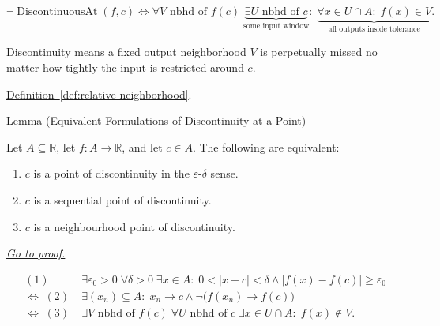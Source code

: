 \begin{remark*}
\[
\neg \operatorname{DiscontinuousAt}(f,c)
\Longleftrightarrow
\forall V \text{ nbhd of } f(c)\;
\underbrace{\exists U \text{ nbhd of } c}_{\text{some input window}}
:\;
\underbrace{\forall x \in U \cap A:\; f(x) \in V}_{\text{all outputs inside tolerance}}.
\]
\end{remark*}

\begin{remark*}[Interpretation]
Discontinuity means a fixed output neighborhood $V$ is perpetually missed no matter how tightly the input is restricted around $c$.
\end{remark*}

\begin{remark*}[Dependencies]
\hyperref[def:relative-neighborhood]{Definition~\ref*{def:relative-neighborhood}}.
\end{remark*}


\begin{lemmabox}{Lemma (Equivalent Formulations of Discontinuity at a Point)}
\begin{lemma}
\label{lem:equivalent-discontinuity-at-a-point}
Let $A\subseteq \mathbb{R}$, let $f:A\to\mathbb{R}$, and let $c\in A$. The following are equivalent:
\begin{enumerate}
\item $c$ is a point of discontinuity in the $\varepsilon$-$\delta$ sense.
\item $c$ is a sequential point of discontinuity.
\item $c$ is a neighbourhood point of discontinuity.
\end{enumerate}

\smallskip\noindent
\hyperref[prf:equivalent-discontinuity-at-a-point]{\textit{Go to proof.}}
\end{lemma}
\end{lemmabox}

\begin{remark*}
\[
\begin{aligned}
(1)\; &\exists \varepsilon_0>0\;\forall \delta>0\;\exists x\in A:\;0<|x-c|<\delta \land |f(x)-f(c)|\ge \varepsilon_0\\
\Longleftrightarrow\;
(2)\; &\exists (x_n)\subseteq A:\; x_n \to c \land \neg\bigl(f(x_n)\to f(c)\bigr)\\
\Longleftrightarrow\;
(3)\; &\exists V \text{ nbhd of } f(c)\;\forall U \text{ nbhd of } c\;\exists x\in U\cap A:\;f(x)\notin V.
\end{aligned}
\]
\end{remark*}

